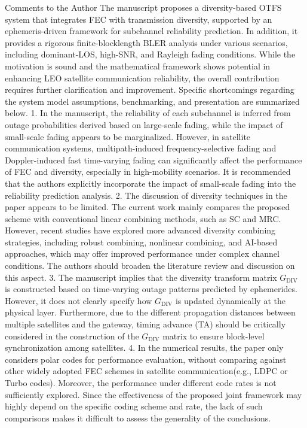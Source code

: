 Comments to the Author
The manuscript proposes a diversity-based OTFS system that integrates FEC with transmission diversity, supported by an ephemeris-driven framework for subchannel reliability prediction. In addition, it provides a rigorous finite-blocklength BLER analysis under various scenarios, including dominant-LOS, high-SNR, and Rayleigh fading conditions. While the motivation is sound and the mathematical framework shows potential in enhancing LEO satellite communication reliability, the overall contribution requires further clarification and improvement. Specific shortcomings regarding the system model assumptions, benchmarking, and presentation are summarized below.
1. In the manuscript, the reliability of each subchannel is inferred from outage probabilities derived based on large-scale fading, while the impact of small-scale fading appears to be marginalized. However, in satellite communication systems, multipath-induced frequency-selective fading and Doppler-induced fast time-varying fading can significantly affect the performance of FEC and diversity, especially in high-mobility scenarios. It is recommended that the authors explicitly incorporate the impact of small-scale fading into the reliability prediction analysis.
2. The discussion of diversity techniques in the paper appears to be limited. The current work mainly compares the proposed scheme with conventional linear combining methods, such as SC and MRC. However, recent studies have explored more advanced diversity combining strategies, including robust combining, nonlinear combining, and AI-based approaches, which may offer improved performance under complex channel conditions. The authors should broaden the literature review and discussion on this aspect.
3. The manuscript implies that the diversity transform matrix $G_{\mathrm{DIV}}$ is constructed based on time-varying outage patterns predicted by ephemerides. However, it does not clearly specify how $G_{\mathrm{DIV}}$ is updated dynamically at the physical layer. Furthermore, due to the different propagation distances between multiple satellites and the gateway, timing advance (TA) should be critically considered in the construction of the $G_{\mathrm{DIV}}$ matrix to ensure block-level synchronization among satellites.
4. In the numerical results, the paper only considers polar codes for performance evaluation, without comparing against other widely adopted FEC schemes in satellite communication(e.g., LDPC or Turbo codes). Moreover, the performance under different code rates is not sufficiently explored. Since the effectiveness of the proposed joint framework may highly depend on the specific coding scheme and rate, the lack of such comparisons makes it difficult to assess the generality of the conclusions.
